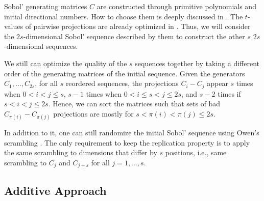 \documentclass[]{elsarticle}
\theoremstyle{definition}
\def\abs#1{\ensuremath{\left \lvert #1 \right \rvert}}
\begin{document}
Sobol' generating matrices $C$ are constructed through primitive polynomials and initial directional numbers. How to choose them is deeply discussed in \cite{kuo}. The $t$-values of pairwise projections are already optimized in \cite{kuo2}. Thus, we will consider the $2s$-dimensional Sobol' sequence described by them to construct the other $s$ $2s$-dimensional sequences.

We still can optimize the quality of the $s$ sequences together by taking a different order of the generating matrices of the initial sequence. Given the generators $C_1,\dots,C_{2s}$, for all $s$ reordered sequences, the projections $C_i-C_j$ appear $s$ times when $0<i<j\leq s$, $s-1$ times when $0<i\leq s<j\leq 2s$, and $s-2$ times if $s<i<j\leq 2s$. Hence, we can sort the matrices such that sets of bad $C_{\pi(i)}-C_{\pi(j)}$ projections are mostly for $s<{\pi(i)}<{\pi(j)}\leq 2s$.

In addition to it, one can still randomize the initial Sobol' sequence using Owen's scrambling \cite{owen.scrambl}. The only requirement to keep the replication property is to apply the same scrambling to dimensions that differ by $s$ positions, i.e., same scrambling to $C_j$ and $C_{j+s}$ for all $j=1,\dots,s$.

%
%
%

%


\subsection{Additive Approach}
\end{document}
